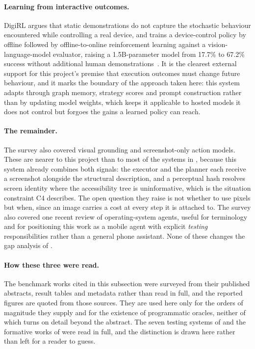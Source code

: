 \paragraph{Learning from interactive outcomes.} DigiRL argues that static
demonstrations do not capture the stochastic behaviour encountered while
controlling a real device, and trains a device-control policy by offline
followed by offline-to-online reinforcement learning against a
vision-language-model evaluator, raising a 1.5B-parameter model from 17.7\% to
67.2\% success without additional human demonstrations~\cite{digirl}. It is the
clearest external support for this project's premise that execution outcomes
must change future behaviour, and it marks the boundary of the approach taken
here: this system adapts through graph memory, strategy scores and prompt
construction rather than by updating model weights, which keeps it applicable
to hosted models it does not control but forgoes the gains a learned policy can
reach.

\paragraph{The remainder.} The survey also covered visual grounding and screenshot-only action models. These are nearer to this project than to most of the systems in , because this system already combines both signals: the executor and the planner each receive a screenshot alongside the structural description, and a perceptual hash resolves screen identity where the accessibility tree is uninformative, which is the situation constraint C4 describes. The open question they raise is not whether to use pixels but when, since an image carries a cost at every step it is attached to. The survey also covered one recent review of operating-system agents, useful for terminology and for positioning this work as a mobile agent with explicit \emph{testing} responsibilities rather than a general phone assistant.
None of these changes the gap analysis of .

\paragraph{How these three were read.} The benchmark works cited in this
subsection were surveyed from their published abstracts, result tables and
metadata rather than read in full, and the reported figures are quoted from
those sources. They are used here only for the orders of magnitude they supply
and for the existence of programmatic oracles, neither of which turns on detail
beyond the abstract. The seven testing systems of  and
the formative works of  were read in full, and the
distinction is drawn here rather than left for a reader to guess.

